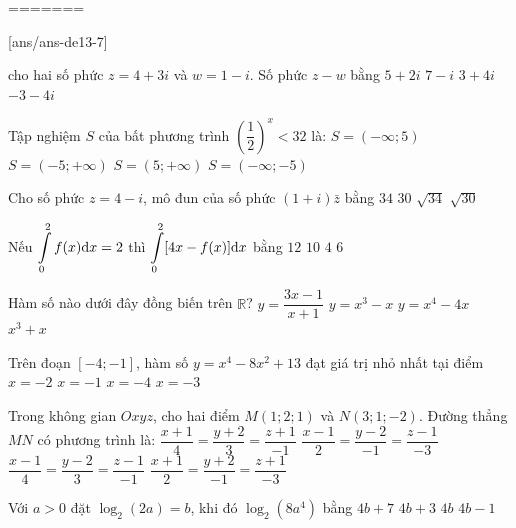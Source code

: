 =======

\begin{name}
	{\tenchude}
	{\tendethi}
	{\tentruong}
	{\thoigian}
\end{name}
[ans/ans-de13-7]

\begin{ex}%
cho hai số phức $z=4+3 i$ và $w=1-i$. Số phức $z-w$ bằng
\choice
{$5+2 i$}
{$7-i$}
{\True $3+4 i$}
{$-3-4 i$}

\end{ex}
\begin{ex}%
Tập nghiệm $S$ của bất phương trình $\left(\dfrac{1}{2}\right)^{x}<32$ là:
\choice
{$S=(-\infty; 5)$}
{\True $S=(-5;+\infty)$}
{$S=(5;+\infty)$}
{$S=(-\infty;-5)$}

\end{ex}
\begin{ex}%
Cho số phức $z=4-i$, mô đun của số phức $(1+i) \bar{z}$ bằng
\choice
{$34$}
{$30$}
{\True $\sqrt{34}$}
{$\sqrt{30}$}

\end{ex}
\begin{ex}%
Nếu $\displaystyle\displaystyle\int\limits_0^2 f(x) \mathrm{d} x=2$ thì $\displaystyle\displaystyle\int\limits_0^2[4 x-f(x)] \mathrm{d} x$ bằng
\choice
{$12$}
{$10$}
{$4$}
{\True $6$}

\end{ex}
\begin{ex}%
Hàm số nào dưới đây đồng biến trên $\mathbb{R}$?
\choice
{$y=\dfrac{3 x-1}{x+1}$}
{$y=x^3-x$}
{$y=x^4-4 x$}
{\True $x^3+x$}

\end{ex}
\begin{ex}%
Trên đoạn $[-4;-1]$, hàm số $y=x^4-8 x^2+13$ đạt giá trị nhỏ nhất tại điểm
\choice
{\True $x=-2$}
{$x=-1$}
{$x=-4$}
{$x=-3$}

\end{ex}
\begin{ex}%
Trong không gian $O x y z$, cho hai điểm $M(1; 2; 1)$ và $N(3; 1;-2)$. Đường thẳng $MN$ có phương trình là:
\choice
{$\dfrac{x+1}{4}=\dfrac{y+2}{3}=\dfrac{z+1}{-1}$}
{\True $\dfrac{x-1}{2}=\dfrac{y-2}{-1}=\dfrac{z-1}{-3}$}
{$\dfrac{x-1}{4}=\dfrac{y-2}{3}=\dfrac{z-1}{-1}$}
{$\dfrac{x+1}{2}=\dfrac{y+2}{-1}=\dfrac{z+1}{-3}$}

\end{ex}
\begin{ex}%
Với $a>0$ đặt $\log_2(2 a)=b$, khi đó $\log_2\left(8 a^4\right)$ bằng
\choice
{$4 b+7$}
{$4 b+3$}
{$4 b$}
{\True $4 b-1$}

\end{ex}
